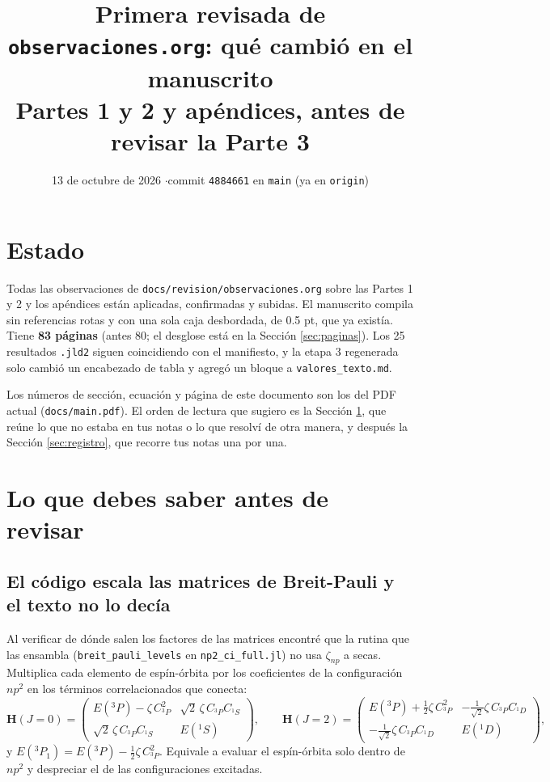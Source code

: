 \documentclass[11pt,a4paper]{article}
\title{Primera revisada de \texttt{observaciones.org}: qué cambió en el manuscrito\\[0.3em]
\large Partes 1 y 2 y apéndices, antes de revisar la Parte 3}
\author{}
\date{13 de octubre de 2026 \quad$\cdot$\quad commit \texttt{4884661} en \texttt{main} (ya en \texttt{origin})}
\newcommand{\arch}[1]{\texttt{\small #1}}
\begin{document}
\maketitle
\vspace{-2.5em}

\section*{Estado}

Todas las observaciones de \arch{docs/revision/observaciones.org} sobre las Partes 1 y 2 y los apéndices están
aplicadas, confirmadas y subidas. El manuscrito compila sin referencias rotas y con una sola caja
desbordada, de 0.5 pt, que ya existía. Tiene \textbf{83 páginas} (antes 80; el desglose está en la
Sección \ref{sec:paginas}). Los 25 resultados \arch{.jld2} siguen coincidiendo con el manifiesto, y
la etapa 3 regenerada solo cambió un encabezado de tabla y agregó un bloque a
\arch{valores\_texto.md}.

Los números de sección, ecuación y página de este documento son los del PDF actual
(\arch{docs/main.pdf}). El orden de lectura que sugiero es la Sección \ref{sec:saber}, que reúne lo
que no estaba en tus notas o lo que resolví de otra manera, y después la
Sección \ref{sec:registro}, que recorre tus notas una por una.

\tableofcontents

\section{Lo que debes saber antes de revisar}
\label{sec:saber}

\subsection{El código escala las matrices de Breit-Pauli y el texto no lo decía}

Al verificar de dónde salen los factores de las matrices encontré que la rutina que las ensambla
(\arch{breit\_pauli\_levels} en \arch{np2\_ci\_full.jl}) no usa $\zeta_{np}$ a secas. Multiplica
cada elemento de espín-órbita por los coeficientes de la configuración $np^2$ en los términos
correlacionados que conecta:
\[
\bm{H}(J{=}0)=\begin{pmatrix} E(^3P)-\zeta\,C_{^3P}^2 & \sqrt2\,\zeta\,C_{^3P}C_{^1S}\\[2pt]
\sqrt2\,\zeta\,C_{^3P}C_{^1S} & E(^1S)\end{pmatrix},\qquad
\bm{H}(J{=}2)=\begin{pmatrix} E(^3P)+\tfrac12\zeta\,C_{^3P}^2 & -\tfrac{1}{\sqrt2}\zeta\,C_{^3P}C_{^1D}\\[2pt]
-\tfrac{1}{\sqrt2}\zeta\,C_{^3P}C_{^1D} & E(^1D)\end{pmatrix},
\]
y $E(^3P_1)=E(^3P)-\tfrac12\zeta\,C_{^3P}^2$. Equivale a evaluar el espín-órbita solo dentro de
$np^2$ y despreciar el de las configuraciones excitadas.
\end{document}
